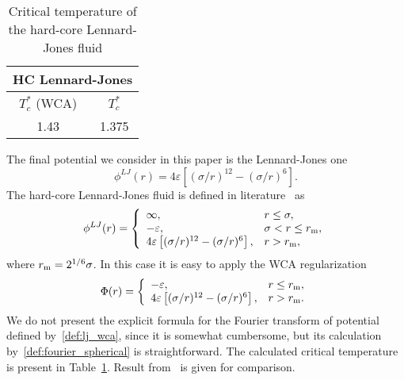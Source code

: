 \begin{table}[h]
	\caption{Critical temperature of the hard-core Lennard-Jones fluid}
	\begin{center}
		\begin{tabular}{|c|c|}
			\hline
			\multicolumn{2}{|c|}{HC Lennard-Jones}\\
			\hline
			$T_c^*$ (WCA) & $T_c^*$ \cite{SowersStanley1991} \\
			\hline
			1.43 & 1.375 \\
			\hline
		\end{tabular}
	\end{center}
	\label{tab:lj_temp_cr}
\end{table}

The final potential we consider in this paper is the Lennard-Jones one
\begin{equation}
	\phi^{LJ}(r) = 4\varepsilon \left[(\sigma/r)^{12} - (\sigma/r)^6\right].
\end{equation}
The hard-core Lennard-Jones fluid is defined in literature~\cite{SowersStanley1991,DiezLargoSolana2010} as
\begin{equation}
	\phi^{LJ}(r) = \left\{
	\begin{array}{llll}
		\infty, & r\leq \sigma,
		\\
		-\varepsilon, & \sigma < r \leq r_{\rm m}, 
		\\
		4\varepsilon \left[(\sigma/r)^{12} - (\sigma/r)^6\right], & r > r_{\rm m},
	\end{array}
	\right.
\end{equation}
where $r_{\rm m}=2^{1/6}\sigma$.
In this case it is easy to apply the WCA regularization
\begin{equation}
	\label{def:lj_wca}
	\Phi(r) = \left\{
	\begin{array}{ll}
		-\varepsilon, & r \leq r_{\rm m},
		\\
		4\varepsilon \left[(\sigma/r)^{12} - (\sigma/r)^6\right], & r > r_{\rm m}.
	\end{array}	
	\right.
\end{equation}
We do not present the explicit formula for the Fourier transform of potential defined by~\eqref{def:lj_wca}, since it is somewhat cumbersome, but its calculation by~\eqref{def:fourier_spherical} is straightforward. 
The calculated critical temperature is present in Table~\ref{tab:lj_temp_cr}. Result from~\cite{SowersStanley1991} is given for comparison.

